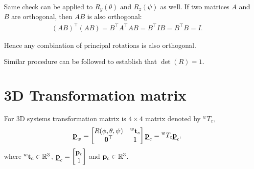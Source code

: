 \documentclass{article}
\begin{document}
Same  check can be applied to $R_y(\theta)$ and  $R_z(\psi)$  as   well. If two
matrices  $A$ and  $B$ are orthogonal, then $AB$ is also orthogonal:
\begin{align}
  (AB)^\top(AB)  = B^\top A^\top A B =   B^\top I  B =  B^\top B = I.
\end{align}

Hence any combination of principal rotations is also orthogonal.

Similar procedure can  be followed to establish  that  $\det(R) = 1$.

\section{3D  Transformation matrix}
For  3D  systems transformation matrix is  $4 \times 4$ matrix denoted  by ${}^wT_c$,
% 
\begin{align}
  \underline{\mathbf{p}}_w = \begin{bmatrix}
    R(\phi, \theta, \psi) & {}^w\mathbf{t}_c  \\
    \boldsymbol{0}^\top &  1
  \end{bmatrix}  \underline{\mathbf{p}}_c  = {}^wT_c \underline{\mathbf{p}}_c,
\end{align}
% 
where  ${}^w\mathbf{t}_c   \in \mathbb{R}^3$, $\underline{\mathbf{p}}_c =  \begin{bmatrix} \mathbf{p}_c   \\
  1   \end{bmatrix}$ and $\mathbf{p}_c  \in \mathbb{R}^3$.
\end{document}
